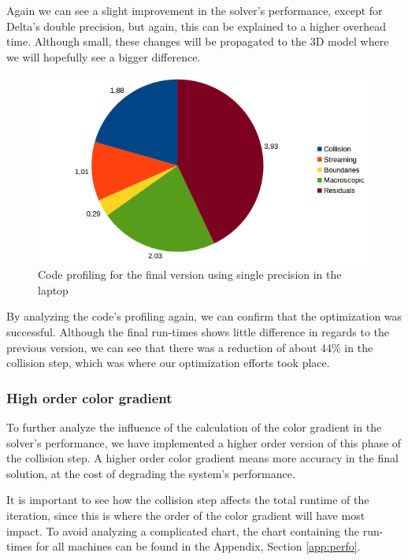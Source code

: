 \documentclass[12pt, openany]{book}
\begin{document}
  Again we can see a slight improvement in the solver's performance, except for Delta's double precision, but again, this can be explained to a higher overhead time. Although small, these changes will be propagated to the 3D model where we will hopefully see a bigger difference.
  
  \begin{figure}[H]
  	\centering
  	\includegraphics[width=\linewidth]{Resources/Images/vfvprofile.png}
  	\caption{Code profiling for the final version using single precision in the laptop}
  	\label{fig:vfvprofile}
  \end{figure}
  
  By analyzing the code's profiling again, we can confirm that the optimization was successful. Although the final run-times shows little difference in regards to the previous version, we can see that there was a reduction of about 44\% in the collision step, which was where our optimization efforts took place.
  
\subsubsection{High order color gradient}
To further analyze the influence of the calculation of the color gradient in the solver's performance, we have implemented a higher order version of this phase of the collision step. A higher order color gradient means more accuracy in the final solution, at the cost of degrading the system's performance.\par
It is important to see how the collision step affects the total runtime of the iteration, since this is where the order of the color gradient will have most impact. To avoid analyzing a complicated chart, the chart containing the run-times for all machines can be found in the Appendix, Section \ref{app:perfo}.
\end{document}
